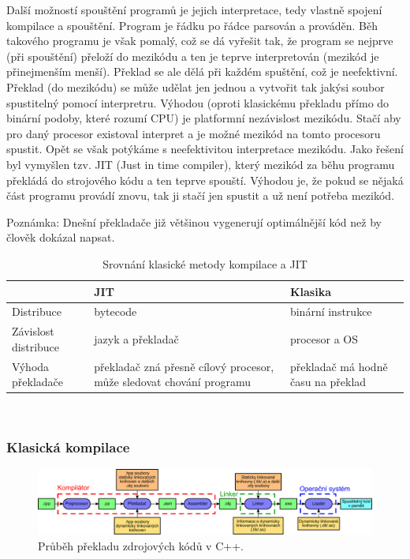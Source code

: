 Další možností spouštění programů je jejich interpretace, tedy vlastně spojení kompilace a spouštění. Program je řádku po řádce parsován a prováděn. Běh takového programu je však pomalý, což se dá vyřešit tak, že program se nejprve (při spouštění) přeloží do mezikódu a ten je teprve interpretován (mezikód je přinejmenším menší). Překlad se ale dělá při každém spuštění, což je neefektivní. Překlad (do mezikódu) se může udělat jen jednou a vytvořit tak jakýsi soubor spustitelný pomocí interpretru. Výhodou (oproti klasickému překladu přímo do binární podoby, které rozumí CPU) je platformní nezávislost mezikódu. Stačí aby pro daný procesor existoval interpret a je možné mezikód na tomto procesoru spustit. Opět se však potýkáme s neefektivitou interpretace mezikódu. Jako řešení byl vymyšlen tzv. JIT (Just in time compiler), který mezikód za běhu programu překládá do strojového kódu a ten teprve spouští. Výhodou je, že pokud se nějaká část programu provádí znovu, tak ji stačí jen spustit a už není potřeba mezikód.

Poznámka: Dnešní překladače již většinou vygenerují optimálnější kód než by člověk dokázal napsat.

\begin{table}[h]
	{\centering
	\begin{tabular}{ l || p{4cm} | p{4cm} }
		& JIT & Klasika \\
		\hline
		\hline
		Distribuce & bytecode & binární instrukce \\
		\hline
		Závislost distribuce & jazyk a překladač & procesor a OS \\
		\hline
		Výhoda překladače & překladač zná přesně cílový procesor, může sledovat chování programu & překladač má hodně času na překlad
	\end{tabular} \\
	}
	\caption{Srovnání klasické metody kompilace a JIT}
	\label{tab:Srovnani_JIT}
\end{table}


\subsubsection{Klasická kompilace}
\begin{figure}[h]
	\centering
	\includegraphics[width=15cm]{i2/softwarove_inzenyrstvi/obrazky/Preklad.pdf}
	\caption{Průběh překladu zdrojových kódů v C++.}
	\label{pic:Preklad}
\end{figure}

